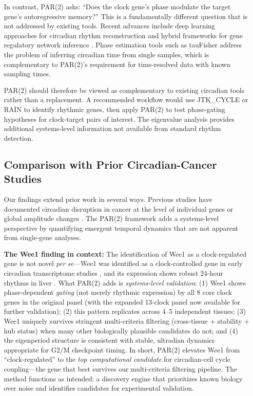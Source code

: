 \documentclass[11pt,a4paper]{article}
\begin{document}
In contrast, PAR(2) asks: ``Does the clock gene's phase modulate the target gene's autoregressive memory?'' This is a fundamentally different question that is not addressed by existing tools. Recent advances include deep learning approaches for circadian rhythm reconstruction \citep{dcpr2025bioinf} and hybrid frameworks for gene regulatory network inference \citep{cgrf2025bmcbioinf}. Phase estimation tools such as tauFisher \citep{taufisher2024natcomm} address the problem of inferring circadian time from single samples, which is complementary to PAR(2)'s requirement for time-resolved data with known sampling times.

PAR(2) should therefore be viewed as complementary to existing circadian tools rather than a replacement. A recommended workflow would use JTK\_CYCLE or RAIN to identify rhythmic genes, then apply PAR(2) to test phase-gating hypotheses for clock-target pairs of interest. The eigenvalue analysis provides additional systems-level information not available from standard rhythm detection.

\subsection{Comparison with Prior Circadian-Cancer Studies}

Our findings extend prior work in several ways. Previous studies have documented circadian disruption in cancer at the level of individual genes \citep{fu2003circadian, gery2006circadian} or global amplitude changes \citep{ye2018orchestration}. The PAR(2) framework adds a systems-level perspective by quantifying emergent temporal dynamics that are not apparent from single-gene analyses.

\textbf{The Wee1 finding in context:} The identification of Wee1 as a clock-regulated gene is not novel \textit{per se}---Wee1 was identified as a clock-controlled gene in early circadian transcriptome studies \citep{matsuo2003control}, and its expression shows robust 24-hour rhythms in liver \citep{sato2009circadian}. What PAR(2) adds is \textit{systems-level validation}: (1) Wee1 shows phase-dependent \textit{gating} (not merely rhythmic expression) by all 8 core clock genes in the original panel (with the expanded 13-clock panel now available for further validation); (2) this pattern replicates across 4--5 independent tissues; (3) Wee1 uniquely survives stringent multi-criteria filtering (cross-tissue + stability + hub status) when many other biologically plausible candidates do not; and (4) the eigenperiod structure is consistent with stable, ultradian dynamics appropriate for G2/M checkpoint timing. In short, PAR(2) elevates Wee1 from ``clock-regulated'' to the \textit{top computational candidate} for circadian-cell cycle coupling---the gene that best survives our multi-criteria filtering pipeline. The method functions as intended: a discovery engine that prioritizes known biology over noise and identifies candidates for experimental validation.
\end{document}
